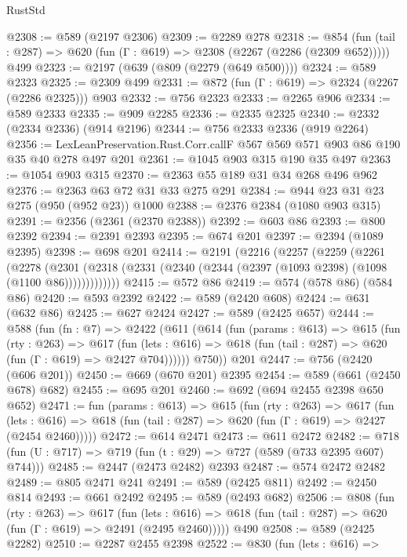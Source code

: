 \begin{lexlean}{RustStd}
\begin{coremodule}
@2308 := @589 (@2197 @2306)
@2309 := @2289 @278
@2318 := @854
    (fun (tail : @287) => @620 (fun (Γ : @619) => @2308 (@2267 (@2286 (@2309 @652)))))
    @499
@2323 := @2197 (@639 (@809 (@2279 (@649 @500))))
@2324 := @589 @2323
@2325 := @2309 @499
@2331 := @872 (fun (Γ : @619) => @2324 (@2267 (@2286 @2325))) @903
@2332 := @756 @2323
@2333 := @2265 @906
@2334 := @589 @2333
@2335 := @909 @2285
@2336 := @2335 @2325
@2340 := @2332 (@2334 @2336) (@914 @2196)
@2344 := @756 @2333 @2336 (@919 @2264)
@2356 := LexLeanPreservation.Rust.Corr.callF @567 @569 @571 @903 @86 @190 @35 @40 @278 @497 @201
@2361 := @1045 @903 @315 @190 @35 @497
@2363 := @1054 @903 @315
@2370 := @2363 @55 @189 @31 @34 @268 @496 @962
@2376 := @2363 @63 @72 @31 @33 @275 @291
@2384 := @944 @23 @31 @23 @275 (@950 (@952 @23)) @1000
@2388 := @2376 @2384 (@1080 @903 @315)
@2391 := @2356 (@2361 (@2370 @2388))
@2392 := @603 @86
@2393 := @800 @2392
@2394 := @2391 @2393
@2395 := @674 @201
@2397 := @2394 (@1089 @2395)
@2398 := @698 @201
@2414 := @2191
    (@2216
      (@2257
        (@2259
          (@2261
            (@2278
              (@2301 (@2318 (@2331 (@2340 (@2344 (@2397 (@1093 @2398) (@1098 (@1100 @86)))))))))))))
@2415 := @572 @86
@2419 := @574 (@578 @86) (@584 @86)
@2420 := @593 @2392
@2422 := @589 (@2420 @608)
@2424 := @631 (@632 @86)
@2425 := @627 @2424
@2427 := @589 (@2425 @657)
@2444 := @588
    (fun (fn : @7) =>
    @2422
      (@611
        (@614
          (fun (params : @613) =>
          @615
            (fun (rty : @263) =>
            @617
              (fun (lets : @616) =>
              @618 (fun (tail : @287) => @620 (fun (Γ : @619) => @2427 @704))))))
        @750))
    @201
@2447 := @756 (@2420 (@606 @201))
@2450 := @669 (@670 @201) @2395
@2454 := @589 (@661 (@2450 @678) @682)
@2455 := @695 @201
@2460 := @692 (@694 @2455 @2398 @650 @652)
@2471 := fun (params : @613) =>
  @615
    (fun (rty : @263) =>
    @617
      (fun (lets : @616) =>
      @618 (fun (tail : @287) => @620 (fun (Γ : @619) => @2427 (@2454 @2460)))))
@2472 := @614 @2471
@2473 := @611 @2472
@2482 := @718 (fun (U : @717) => @719 (fun (t : @29) => @727 (@589 (@733 @2395 @607) @744)))
@2485 := @2447 (@2473 @2482) @2393
@2487 := @574 @2472 @2482
@2489 := @805 @2471 @241
@2491 := @589 (@2425 @811)
@2492 := @2450 @814
@2493 := @661 @2492
@2495 := @589 (@2493 @682)
@2506 := @808
    (fun (rty : @263) =>
    @617
      (fun (lets : @616) =>
      @618 (fun (tail : @287) => @620 (fun (Γ : @619) => @2491 (@2495 @2460)))))
    @490
@2508 := @589 (@2425 @2282)
@2510 := @2287 @2455 @2398
@2522 := @830
    (fun (lets : @616) =>

\end{coremodule}
\end{lexlean}
